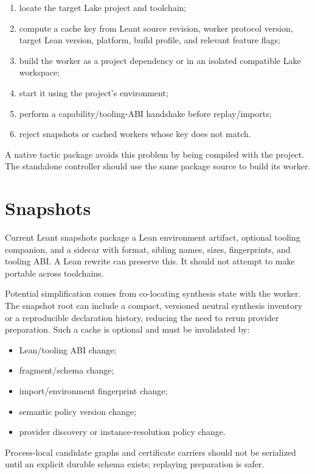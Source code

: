 \documentclass[10pt,letterpaper,oneside]{report}
\newcommand{\code}[1]{\texttt{\detokenize{#1}}}
\begin{document}
\begin{enumerate}
  \item locate the target Lake project and toolchain;
  \item compute a cache key from Leant source revision, worker protocol version, target Lean version, platform, build profile, and relevant feature flags;
  \item build the worker as a project dependency or in an isolated compatible Lake workspace;
  \item start it using the project's environment;
  \item perform a capability/tooling-ABI handshake before replay/imports;
  \item reject snapshots or cached workers whose key does not match.
\end{enumerate}

A native tactic package avoids this problem by being compiled with the project. The standalone controller should use the same package source to build its worker.

\section{Snapshots}

Current Leant snapshots package a Lean environment artifact, optional tooling companion, and a sidecar with format, sibling names, sizes, fingerprints, and tooling ABI. A Lean rewrite can preserve this. It should not attempt to make \code{.olean} portable across toolchains.

Potential simplification comes from co-locating synthesis state with the worker. The snapshot root can include a compact, versioned neutral synthesis inventory or a reproducible declaration history, reducing the need to rerun provider preparation. Such a cache is optional and must be invalidated by:

\begin{itemize}
  \item Lean/tooling ABI change;
  \item fragment/schema change;
  \item import/environment fingerprint change;
  \item semantic policy version change;
  \item provider discovery or instance-resolution policy change.
\end{itemize}

Process-local candidate graphs and certificate carriers should not be serialized until an explicit durable schema exists; replaying preparation is safer.
\end{document}
